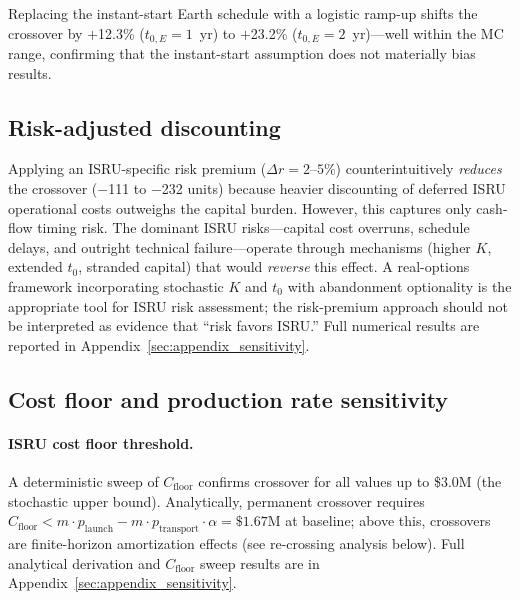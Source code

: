 \documentclass[preprint,12pt]{elsarticle}
\begin{document}
Replacing the instant-start Earth schedule with a logistic ramp-up shifts the crossover by $+$12.3\% ($t_{0,E} = 1$~yr) to $+$23.2\% ($t_{0,E} = 2$~yr)---well within the MC range, confirming that the instant-start assumption does not materially bias results.

\subsection{Risk-adjusted discounting}
\label{sec:risk_premium}

Applying an ISRU-specific risk premium ($\Delta r = 2$--$5\%$) counterintuitively \emph{reduces} the crossover ($-$111 to $-$232 units) because heavier discounting of deferred ISRU operational costs outweighs the capital burden. However, this captures only cash-flow timing risk. The dominant ISRU risks---capital cost overruns, schedule delays, and outright technical failure---operate through mechanisms (higher $K$, extended $t_0$, stranded capital) that would \emph{reverse} this effect. A real-options framework incorporating stochastic $K$ and $t_0$ with abandonment optionality is the appropriate tool for ISRU risk assessment; the risk-premium approach should not be interpreted as evidence that ``risk favors ISRU.'' Full numerical results are reported in Appendix~\ref{sec:appendix_sensitivity}.

\subsection{Cost floor and production rate sensitivity}
\label{sec:cfloor_prodrate}

\paragraph{ISRU cost floor threshold.} A deterministic sweep of $C_{\mathrm{floor}}$ confirms crossover for all values up to \$3.0M (the stochastic upper bound). Analytically, permanent crossover requires $C_{\mathrm{floor}} < m \cdot p_{\mathrm{launch}} - m \cdot p_{\mathrm{transport}} \cdot \alpha = \$1.67$M at baseline; above this, crossovers are finite-horizon amortization effects (see re-crossing analysis below). Full analytical derivation and $C_{\mathrm{floor}}$ sweep results are in Appendix~\ref{sec:appendix_sensitivity}.
\end{document}

